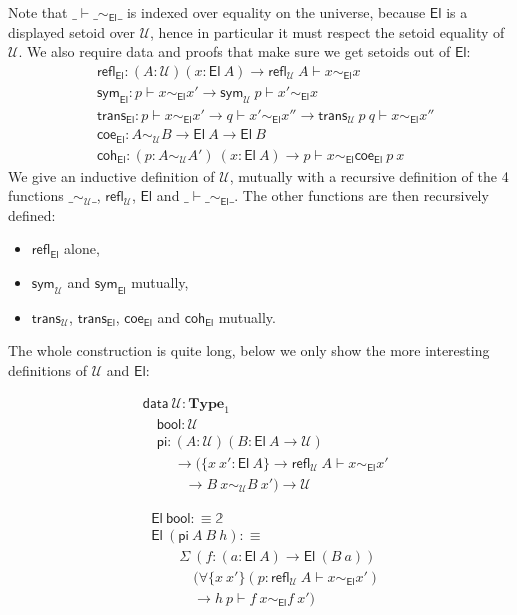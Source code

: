 \documentclass[a4paper,UKenglish,cleveref, autoref, thm-restate]{lipics-v2019}
\newcommand{\setoidU}{\mathcal{U}}
\newcommand{\mType}{\mathbf{Type}}
\newcommand{\El}{\textsf{El}}
\newcommand{\reflu}{\textsf{refl}_\setoidU}
\newcommand{\symu}{\textsf{sym}_\setoidU}
\newcommand{\transu}{\textsf{trans}_\setoidU}
\newcommand{\coeel}{\textsf{coe}_\El}
\newcommand{\cohel}{\textsf{coh}_\El}
\newcommand{\equ}[2]{#1 \sim_\setoidU #2}
\newcommand{\eqel}[3]{#1 \vdash #2 \sim_\El #3}
\providecommand\mathbbm{\mathbb}
\begin{document}
Note that $\eqel{\_}{\_}{\_}$ is indexed over equality on the universe, because
$\El$ is a displayed setoid over $\setoidU$, hence in particular it must respect the setoid
equality of $\setoidU$.
%
We also require data and proofs that make sure we get setoids out of $\El$:
\begin{align*}
  & \textsf{refl}_\El : (A : \setoidU) (x : \El\ A) \to \eqel{\reflu\ A}{x}{x} \\
  & \textsf{sym}_\El : \eqel{p}{x}{x'} \to \eqel{\symu\ p}{x'}{x} \\
  & \textsf{trans}_\El : \eqel{p}{x}{x'} \to \eqel{q}{x'}{x''} \to \eqel{\transu\ p\ q}{x}{x''} \\
  & \coeel : \equ{A}{B} \to \El\ A \to \El\ B \\
  & \cohel : (p : \equ{A}{A'}) \ (x : \El\ A) \to \eqel{p}{x}{\coeel\ p\ x}
\end{align*}
%
We give an inductive definition of $\setoidU$, mutually with a recursive definition
of the 4 functions
$\_\sim_\setoidU\_$, $\textsf{refl}_\setoidU$, $\El$ and $\_\vdash\_\sim_\El\_$.
The other functions are then recursively defined:
\begin{itemize}
\item $\textsf{refl}_\El$ alone,
\item $\textsf{sym}_\setoidU$ and $\textsf{sym}_\El$ mutually,
\item $\textsf{trans}_\setoidU$, $\textsf{trans}_\El$, $\coeel$ and $\cohel$ mutually.
\end{itemize}
The whole construction is quite long, below we only show the more interesting
definitions of $\setoidU$ and $\El$: \\
\begin{minipage}{0.5\textwidth}
\begin{align*}
  & \textsf{data}\ \setoidU : \mType_1 \\
  & \quad \textsf{bool} : \setoidU \\
  & \quad \textsf{pi}
  :  (A : \setoidU) (B : \El\ A \to \setoidU)\\
  & \ \qquad \to (\{x\ x' : \El\ A\} \to \textsf{refl}_\setoidU\ A \vdash x \sim_\El x'\\
  & \qquad\quad \to B\ x \sim_\setoidU B\ x')
  \to \setoidU
\end{align*}
\end{minipage}
\begin{minipage}{0.5\textwidth}
\begin{align*}
  & \El\ \textsf{bool} :\equiv \mathbbm{2} \\
  & \El\ (\textsf{pi}\ A\ B\ h) :\equiv \\
  & \qquad \Sigma\ (f : (a : \El\ A) \to \El\ (B\ a)) \\
  & \qquad \quad
  (\forall\{x\ x'\}(p : \eqel{\reflu\ A}{x}{x'}) \\
  & \qquad \quad\to \eqel{h\ p}{f\ x}{f\ x'})
\end{align*}
\end{minipage}
\\
\end{document}
